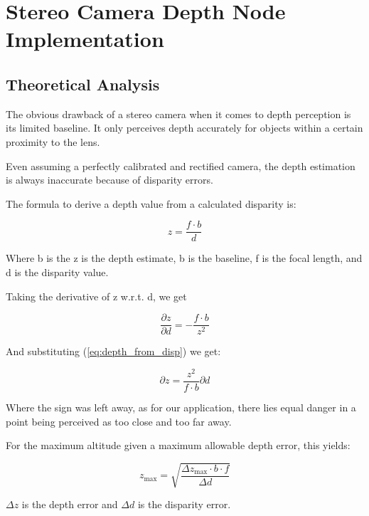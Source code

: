 \chapter{Stereo Camera Depth Node Implementation}
\label{chapter:stereo_camera_depth}

\section{Theoretical Analysis}\label{subsec:theoretical_analysis}

The obvious drawback of a stereo camera when it comes to depth perception is its limited baseline. It only perceives depth accurately for objects within a certain proximity to the lens. 

Even assuming a perfectly calibrated and rectified camera, the depth estimation is always inaccurate because of disparity errors.

The formula to derive a depth value from a calculated disparity is:

\begin{equation}\label{eq:depth_from_disp}
    z = \frac{f \cdot b}{d}
\end{equation}

Where b is the z is the depth estimate, b is the baseline, f is the focal length, and d is the disparity value.

Taking the derivative of z w.r.t. d, we get

\begin{equation}
    \frac{\partial z}{\partial d} = - \frac{f  \cdot b}{z^2}
\end{equation}

And substituting (\cref{eq:depth_from_disp}) we get:

\begin{equation}
    {\partial z} = \frac{z^2}{f  \cdot b}\partial d
\end{equation}

Where the sign was left away, as for our application, there lies equal danger in a point being perceived as too close and too far away.

For the maximum altitude given a maximum allowable depth error, this yields:

\begin{equation}\label{eq:depth_error_formula}
    z_{\text{max}} = \sqrt{\frac{\Delta z_{\text{max}} \cdot b \cdot f}{\Delta d}}
\end{equation}

$\Delta z$ is the depth error and $\Delta d$ is the disparity error.


